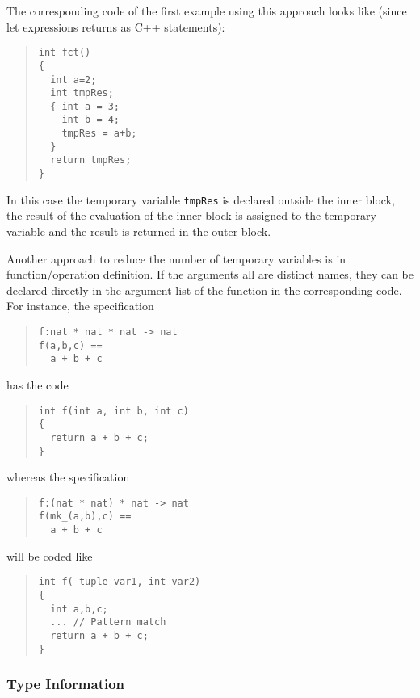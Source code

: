 \documentclass[a4paper,dvips]{article}
\begin{document}
The corresponding code of the first example using this approach looks
like (since let expressions returns as C++ statements):

\begin{quote}
\begin{verbatim}
int fct()
{
  int a=2;
  int tmpRes;
  { int a = 3;
    int b = 4;
    tmpRes = a+b;
  }
  return tmpRes;
}
\end{verbatim}
\end{quote}

In this case the temporary variable {\tt tmpRes} is declared outside
the inner block, the result of the evaluation of the inner block is
assigned to the temporary variable and the result is returned in the
outer block. 

Another approach to reduce the number of temporary variables is in
function/operation definition.  If the arguments all are distinct
names, they can be declared directly in the argument list of the
function in the corresponding code. For instance, the specification

\begin{quote}
\begin{verbatim}
f:nat * nat * nat -> nat
f(a,b,c) ==
  a + b + c

\end{verbatim}
\end{quote}
has the code
\begin{quote}
\begin{verbatim}
int f(int a, int b, int c)
{
  return a + b + c;
}
\end{verbatim}
\end{quote}

whereas the specification

\begin{quote}
\begin{verbatim}
f:(nat * nat) * nat -> nat
f(mk_(a,b),c) ==
  a + b + c
\end{verbatim}
\end{quote}
will be coded like
\begin{quote}
\begin{verbatim}
int f( tuple var1, int var2)
{
  int a,b,c;
  ... // Pattern match
  return a + b + c;
}
\end{verbatim}
\end{quote}

\subsubsection{Type Information}\label{TI}
\end{document}
